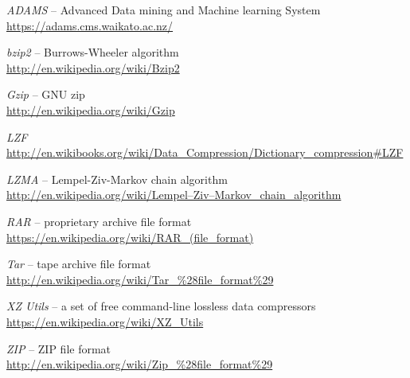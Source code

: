 %

\begin{thebibliography}{999}

		\textit{ADAMS} -- Advanced Data mining and Machine learning System \\
		\url{https://adams.cms.waikato.ac.nz/}{}
		
		\textit{bzip2} -- Burrows-Wheeler algorithm \\
		\url{http://en.wikipedia.org/wiki/Bzip2}{}
		
		\textit{Gzip} -- GNU zip \\
		\url{http://en.wikipedia.org/wiki/Gzip}{}
		
		\textit{LZF} \\
		\url{http://en.wikibooks.org/wiki/Data_Compression/Dictionary_compression#LZF}{}
		
		\textit{LZMA} -- Lempel-Ziv-Markov chain algorithm \\
		\url{http://en.wikipedia.org/wiki/Lempel–Ziv–Markov_chain_algorithm}{}

		\textit{RAR} -- proprietary archive file format \\
		\url{https://en.wikipedia.org/wiki/RAR_(file_format)}{}

		\textit{Tar} -- tape archive file format \\
		\url{http://en.wikipedia.org/wiki/Tar_\%28file_format\%29}{}

		\textit{XZ Utils} -- a set of free command-line lossless data compressors \\
		\url{https://en.wikipedia.org/wiki/XZ_Utils}{}

		\textit{ZIP} -- ZIP file format \\
		\url{http://en.wikipedia.org/wiki/Zip_\%28file_format\%29}{}

\end{thebibliography}
